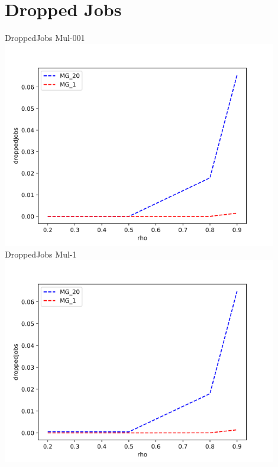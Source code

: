 \documentclass[a4paper]{article}
\begin{document}
\section*{Dropped Jobs}
\begin{center}
DroppedJobs Mul-001 \\
\includegraphics[width=0.9\textwidth]{droppedJobs-Mul_001.png}
DroppedJobs Mul-1 \\
\includegraphics[width=0.9\textwidth]{droppedJobs-Mul_1.png}
\newpage

\end{center}
\end{document}
